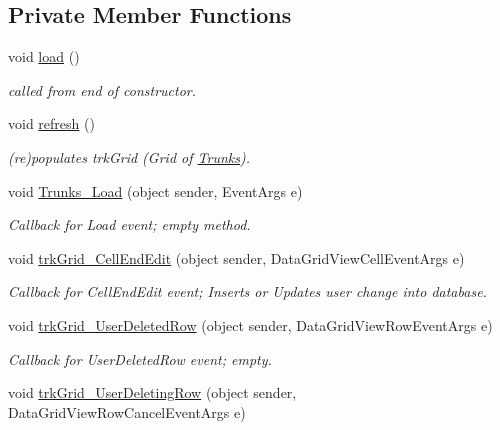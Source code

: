 \subsection*{Private Member Functions}
\begin{DoxyCompactItemize}
\item 
void \hyperlink{class_ias_pbx_config_1_1_trunks_ac6c14b9634426a42541b8fa28adfd6c9}{load} ()
\begin{DoxyCompactList}\small\item\em called from end of constructor. \item\end{DoxyCompactList}\item 
void \hyperlink{class_ias_pbx_config_1_1_trunks_a6499b1bd73dbd347476a9e2df5538691}{refresh} ()
\begin{DoxyCompactList}\small\item\em (re)populates trkGrid (Grid of \hyperlink{class_ias_pbx_config_1_1_trunks}{Trunks}). \item\end{DoxyCompactList}\item 
void \hyperlink{class_ias_pbx_config_1_1_trunks_a966dcab2782c249c4dc9728bc90c627e}{Trunks\_\-Load} (object sender, EventArgs e)
\begin{DoxyCompactList}\small\item\em Callback for Load event; empty method. \item\end{DoxyCompactList}\item 
void \hyperlink{class_ias_pbx_config_1_1_trunks_a991c7f28f689229614bd13673f9a9fe9}{trkGrid\_\-CellEndEdit} (object sender, DataGridViewCellEventArgs e)
\begin{DoxyCompactList}\small\item\em Callback for CellEndEdit event; Inserts or Updates user change into database. \item\end{DoxyCompactList}\item 
void \hyperlink{class_ias_pbx_config_1_1_trunks_a14b41e3440a986850334bbfc0e096d37}{trkGrid\_\-UserDeletedRow} (object sender, DataGridViewRowEventArgs e)
\begin{DoxyCompactList}\small\item\em Callback for UserDeletedRow event; empty. \item\end{DoxyCompactList}\item 
void \hyperlink{class_ias_pbx_config_1_1_trunks_a707a8fb3145ec2a85fccff41d1057532}{trkGrid\_\-UserDeletingRow} (object sender, DataGridViewRowCancelEventArgs e)

\end{DoxyCompactItemize}
